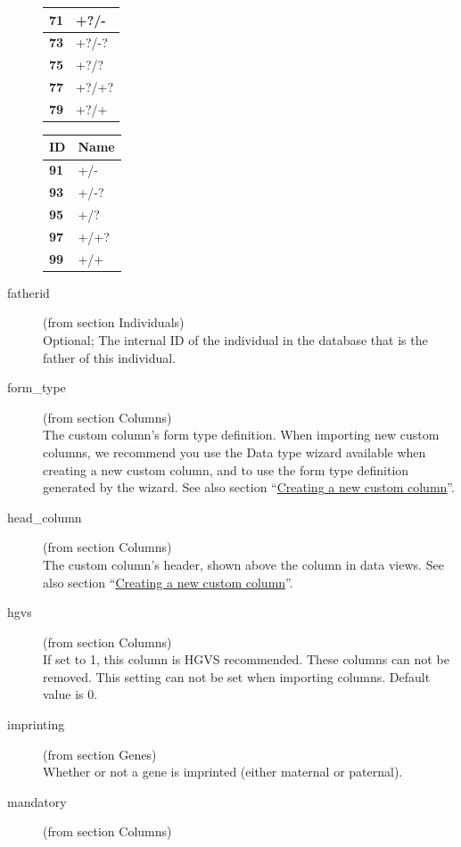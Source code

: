 \documentclass[a4paper,oneside,openany,12pt]{memoir}
\begin{document}
\begin{description}
\begin{minipage}[t]{3.15cm}
\begin{tabular}{>{\bfseries}p{0.6cm} p{1.4cm}}
      71 & +?/-\\ \hline
      73 & +?/-?\\ \hline
      75 & +?/?\\ \hline
      77 & +?/+?\\ \hline
      79 & +?/+\\ \hline
    \end{tabular}
  \end{minipage}
  \begin{tabular}{>{\bfseries}p{0.6cm} p{1.4cm}}
    ID & \textbf{Name}\\ \hline \hline
    91 & +/-\\ \hline
    93 & +/-?\\ \hline
    95 & +/?\\ \hline
    97 & +/+?\\ \hline
    99 & +/+\\ \hline
  \end{tabular}
  \item[fatherid] (from section Individuals)\hfill \\
  Optional; The internal ID of the individual in the database that is the father of this individual.
  \item[form\_type] (from section Columns)\hfill \\
  The custom column's form type definition.
  When importing new custom columns, we recommend you use the Data type wizard available when creating a new custom column, and to use the form type definition generated by the wizard.
  See also section ``\hyperlink{sec:custom_column_create}{Creating a new custom column}''.
  \item[head\_column] (from section Columns)\hfill \\
  The custom column's header, shown above the column in data views.
  See also section ``\hyperlink{sec:custom_column_create}{Creating a new custom column}''.
  \item[hgvs] (from section Columns)\hfill \\
  If set to 1, this column is HGVS recommended.
  These columns can not be removed.
  This setting can not be set when importing columns.
  Default value is 0.
  \item[imprinting] (from section Genes)\hfill \\
  Whether or not a gene is imprinted (either maternal or paternal).
  \item[mandatory] (from section Columns)\hfill \\

\end{description}
\end{document}
